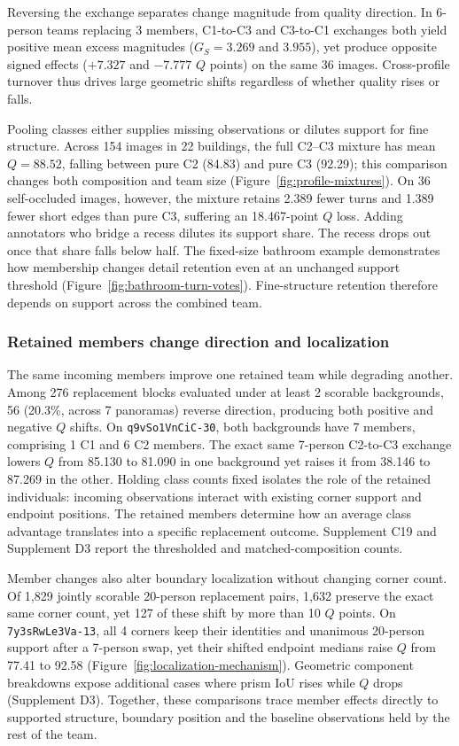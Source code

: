 Reversing the exchange separates change magnitude from quality direction. In 6-person teams replacing 3 members, C1-to-C3 and C3-to-C1 exchanges both yield positive mean excess magnitudes ($G_S=3.269$ and $3.955$), yet produce opposite signed effects ($+7.327$ and $-7.777$ $Q$ points) on the same 36 images. Cross-profile turnover thus drives large geometric shifts regardless of whether quality rises or falls.

Pooling classes either supplies missing observations or dilutes support for fine structure. Across 154 images in 22 buildings, the full C2--C3 mixture has mean $Q=88.52$, falling between pure C2 (84.83) and pure C3 (92.29); this comparison changes both composition and team size (Figure~\ref{fig:profile-mixtures}). On 36 self-occluded images, however, the mixture retains 2.389 fewer turns and 1.389 fewer short edges than pure C3, suffering an 18.467-point $Q$ loss. Adding annotators who bridge a recess dilutes its support share. The recess drops out once that share falls below half. The fixed-size bathroom example demonstrates how membership changes detail retention even at an unchanged support threshold (Figure~\ref{fig:bathroom-turn-votes}). Fine-structure retention therefore depends on support across the combined team.



\subsubsection{Retained members change direction and localization}

The same incoming members improve one retained team while degrading another. Among 276 replacement blocks evaluated under at least 2 scorable backgrounds, 56 (20.3\%, across 7 panoramas) reverse direction, producing both positive and negative $Q$ shifts. On \texttt{q9vSo1VnCiC-30}, both backgrounds have 7 members, comprising 1 C1 and 6 C2 members. The exact same 7-person C2-to-C3 exchange lowers $Q$ from 85.130 to 81.090 in one background yet raises it from 38.146 to 87.269 in the other. Holding class counts fixed isolates the role of the retained individuals: incoming observations interact with existing corner support and endpoint positions. The retained members determine how an average class advantage translates into a specific replacement outcome. Supplement C19 and Supplement D3 report the thresholded and matched-composition counts.

Member changes also alter boundary localization without changing corner count. Of 1,829 jointly scorable 20-person replacement pairs, 1,632 preserve the exact same corner count, yet 127 of these shift by more than 10 $Q$ points. On \texttt{7y3sRwLe3Va-13}, all 4 corners keep their identities and unanimous 20-person support after a 7-person swap, yet their shifted endpoint medians raise $Q$ from 77.41 to 92.58 (Figure~\ref{fig:localization-mechanism}). Geometric component breakdowns expose additional cases where prism IoU rises while $Q$ drops (Supplement D3). Together, these comparisons trace member effects directly to supported structure, boundary position and the baseline observations held by the rest of the team.



